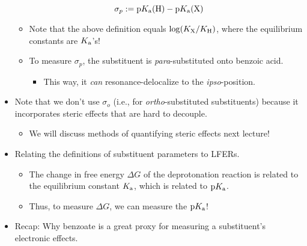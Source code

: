 \documentclass[../notes.tex]{subfiles}
\begin{document}
\begin{itemize}
    \begin{equation*}
        \sigma_p := \pKa(\ce{H})-\pKa(\ce{X})
    \end{equation*}
    \begin{itemize}
        \item Note that the above definition equals $\log(K_{\ce{X}}/K_{\ce{H}})$, where the equilibrium constants are $K_\textup{a}$'s!
        \item To measure $\sigma_p$, the substituent is \emph{para}-substituted onto benzoic acid.
        \begin{itemize}
            \item This way, it \emph{can} resonance-delocalize to the \emph{ipso}-position.
        \end{itemize}
    \end{itemize}
    \item Note that we don't use $\sigma_o$ (i.e., for \emph{ortho}-substituted substituents) because it incorporates steric effects that are hard to decouple.
    \begin{itemize}
        \item We will discuss methods of quantifying steric effects next lecture!
    \end{itemize}
    \item Relating the definitions of substituent parameters to LFERs.
    \begin{itemize}
        \item The change in free energy $\Delta G$ of the deprotonation reaction is related to the equilibrium constant $K_\textup{a}$, which is related to $\textup{p}K_\textup{a}$.
        \item Thus, to measure $\Delta G$, we can measure the $\textup{p}K_\textup{a}$!
    \end{itemize}
    \item Recap: Why benzoate is a great proxy for measuring a substituent's electronic effects.
    \begin{itemize}

\end{itemize}
\end{itemize}
\end{document}
